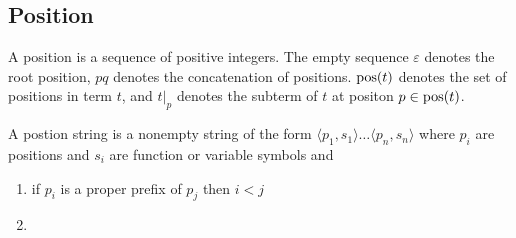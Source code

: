 \documentclass[ 
xcolor={usenames,dvipsnames,svgnames,tablem} 
,handout
]{beamer}
\begin{document}
\subsection{Position}
\begin{frame}
\begin{definition}
A position is a sequence of positive integers.
The empty sequence $\varepsilon$ denotes the root position,
$pq$ denotes the concatenation of positions. 
$\operatorname{pos}(t)$ denotes the set of positions in term $t$, and $t|_p$ denotes the subterm of $t$ at positon $p\in\operatorname{pos}(t)$.
\end{definition}

\begin{definition}
A postion string is a nonempty string of the form $\langle p_1,s_1\rangle\ldots\langle p_n,s_n\rangle$
where $p_i$ are positions and $s_i$ are function or variable symbols and
\begin{enumerate}
\item
if $p_i$ is a proper prefix of $p_j$ then $i<j$
\item
\end{enumerate}
\end{definition}
\end{frame}

\begin{frame}
\begin{definition}

\end{definition}
\end{frame}
\end{document}
